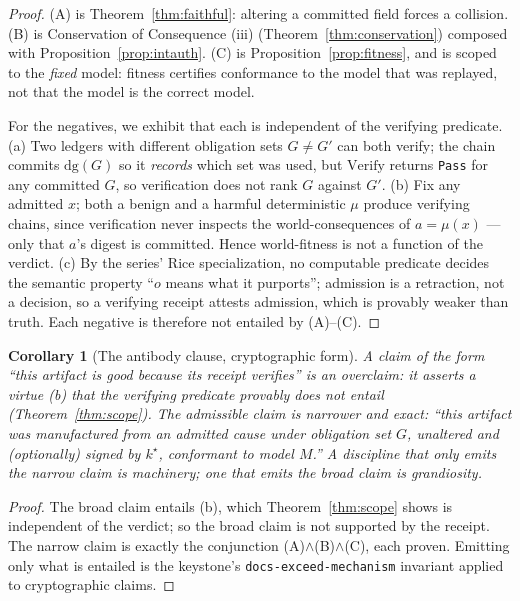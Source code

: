 \documentclass[11pt,oneside]{book}
\theoremstyle{definition}
\theoremstyle{plain}
\newtheorem{corollary}[theorem]{Corollary}
\theoremstyle{remark}
\newcommand{\muop}{\mu}                        %
\newcommand{\dg}{\mathrm{dg}}                   %
\newcommand{\code}[1]{\texttt{#1}}
\begin{document}
\begin{proof}
(A) is Theorem~\ref{thm:faithful}: altering a committed field forces a collision. (B) is
Conservation of Consequence (iii) (Theorem~\ref{thm:conservation}) composed with
Proposition~\ref{prop:intauth}. (C) is Proposition~\ref{prop:fitness}, and is scoped to the
\emph{fixed} model: fitness certifies conformance to the model that was replayed, not that the
model is the correct model.

For the negatives, we exhibit that each is independent of the verifying predicate. (a) Two
ledgers with different obligation sets $G\ne G'$ can both verify; the chain commits $\dg(G)$
so it \emph{records} which set was used, but $\mathrm{Verify}$ returns \code{Pass} for any
committed $G$, so verification does not rank $G$ against $G'$. (b) Fix any admitted $x$; both a
benign and a harmful deterministic $\muop$ produce verifying chains, since verification never
inspects the world-consequences of $a=\muop(x)$ --- only that $a$'s digest is committed. Hence
world-fitness is not a function of the verdict. (c) By the series' Rice specialization, no
computable predicate decides the semantic property ``$o$ means what it purports''; admission is
a retraction, not a decision, so a verifying receipt attests admission, which is provably
weaker than truth. Each negative is therefore not entailed by (A)--(C). \end{proof}

\begin{corollary}[The antibody clause, cryptographic form]\label{cor:antibody}
A claim of the form ``this artifact is \emph{good} because its receipt verifies'' is an
overclaim: it asserts a virtue (b) that the verifying predicate provably does not entail
(Theorem~\ref{thm:scope}). The admissible claim is narrower and exact: ``this artifact was
manufactured from an admitted cause under obligation set $G$, unaltered and (optionally)
signed by $k^{\star}$, conformant to model $M$.'' A discipline that only emits the narrow claim
is machinery; one that emits the broad claim is grandiosity.
\end{corollary}

\begin{proof}
The broad claim entails (b), which Theorem~\ref{thm:scope} shows is independent of the verdict;
so the broad claim is not supported by the receipt. The narrow claim is exactly the conjunction
(A)$\wedge$(B)$\wedge$(C), each proven. Emitting only what is entailed is the keystone's
\code{docs-exceed-mechanism} invariant applied to cryptographic claims. \end{proof}
\end{document}
